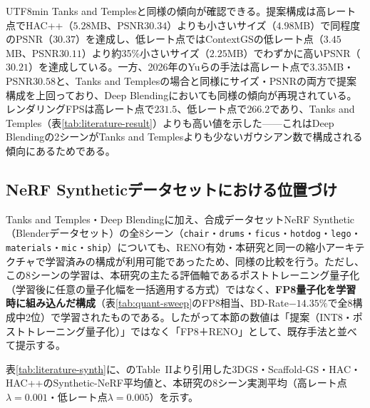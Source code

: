 \documentclass{ieeeaccess}
\begin{document}
\begin{CJK}{UTF8}{min}
Tanks and Templesと同様の傾向が確認できる。提案構成は高レート点でHAC++（$5.28$MB、PSNR$30.34$）よりも小さいサイズ（$4.98$MB）で同程度のPSNR（$30.37$）を達成し、低レート点ではContextGSの低レート点（$3.45$MB、PSNR$30.11$）より約35\%小さいサイズ（$2.25$MB）でわずかに高いPSNR（$30.21$）を達成している。一方、2026年のYuらの手法は高レート点で$3.35$MB・PSNR$30.58$と、Tanks and Templesの場合と同様にサイズ・PSNRの両方で提案構成を上回っており、Deep Blendingにおいても同様の傾向が再現されている。レンダリングFPSは高レート点で$231.5$、低レート点で$266.2$であり、Tanks and Temples（表\ref{tab:literature-result}）よりも高い値を示した——これはDeep Blendingの2シーンがTanks and Templesよりも少ないガウシアン数で構成される傾向にあるためである。

\subsection{NeRF Syntheticデータセットにおける位置づけ}
Tanks and Temples・Deep Blendingに加え、合成データセットNeRF Synthetic（Blenderデータセット）の全8シーン（\texttt{chair}・\texttt{drums}・\texttt{ficus}・\texttt{hotdog}・\texttt{lego}・\texttt{materials}・\texttt{mic}・\texttt{ship}）についても、RENO有効・本研究と同一の縮小アーキテクチャで学習済みの構成が利用可能であったため、同様の比較を行う。ただし、この8シーンの学習は、本研究の主たる評価軸であるポストトレーニング量子化（学習後に任意の量子化幅を一括適用する方式）ではなく、\textbf{FP8量子化を学習時に組み込んだ構成}（表\ref{tab:quant-sweep}のFP8相当、BD-Rate$-14.35\%$で全8構成中2位）で学習されたものである。したがって本節の数値は「提案（INT8・ポストトレーニング量子化）」ではなく「FP8＋RENO」として、既存手法と並べて提示する。

表\ref{tab:literature-synth}に、\cite{chen2025hacpp}のTable~IIより引用した3DGS・Scaffold-GS・HAC・HAC++のSynthetic-NeRF平均値と、本研究の8シーン実測平均（高レート点$\lambda=0.001$・低レート点$\lambda=0.005$）を示す。


\end{CJK}
\end{document}
